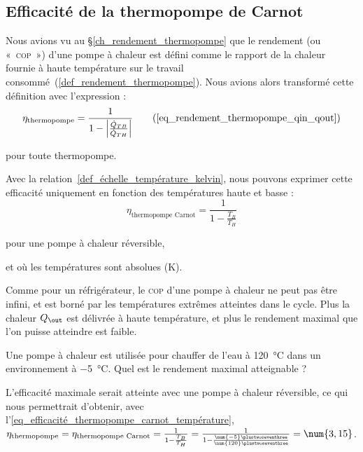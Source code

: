 	\subsection{Efficacité de la thermopompe de Carnot}

		Nous avions vu au \S\ref{ch_rendement_thermopompe} que le rendement (ou «~\textsc{cop}~») d’une pompe à chaleur est défini comme le rapport de la chaleur fournie à haute température sur le travail consommé~(\ref{def_rendement_thermopompe}). Nous avions alors transformé cette définition avec l’expression :
		\begin{equation}
			\eta_\text{thermopompe} = \frac{1}{1 - \left| \frac{\dot Q_{TB}}{\dot Q_{TH}} \right|} \tag{\ref{eq_rendement_thermopompe_qin_qout}}
		\end{equation}
		\begin{equationterms}
			\item pour toute thermopompe.
		\end{equationterms}

		Avec la relation~\ref{def_échelle_température_kelvin}, nous pouvons exprimer cette efficacité uniquement en fonction des températures haute et basse :
		\begin{equation}
			\eta_\text{thermopompe Carnot} = \frac{1}{1 - \frac{T_B}{T_H}}
			\label{eq_efficacité_thermopompe_carnot_température}
		\end{equation}
		\begin{equationterms}
			\item pour une pompe à chaleur réversible,
			\item et où les températures sont absolues (\si{\kelvin}).
		\end{equationterms}

		Comme pour un réfrigérateur, le \textsc{cop} d’une pompe à chaleur ne peut pas être infini, et est borné par les températures extrêmes atteintes dans le cycle. Plus la chaleur $Q_\out$ est délivrée à haute température, et plus le rendement maximal que l’on puisse atteindre est faible.
		
		\begin{anexample}
		 	Une pompe à chaleur est utilisée pour chauffer de l’eau à \SI{120}{\degreeCelsius} dans un environnement à \SI{-5}{\degreeCelsius}. Quel est le rendement maximal atteignable ?
		 		\begin{answer}
		 			L’efficacité maximale serait atteinte avec une pompe à chaleur réversible, ce qui nous permettrait d’obtenir, avec l’\cref{eq_efficacité_thermopompe_carnot_température}, $\eta_\text{thermopompe} = \eta_\text{thermopompe Carnot} = \frac{1}{1 - \frac{T_B}{T_H}} = \frac{1}{1 - \frac{\num{-5}\plustwoseventhree}{\num{120}\plustwoseventhree}} = \num{3,15}$.
		 		\end{answer}
		 \end{anexample}
